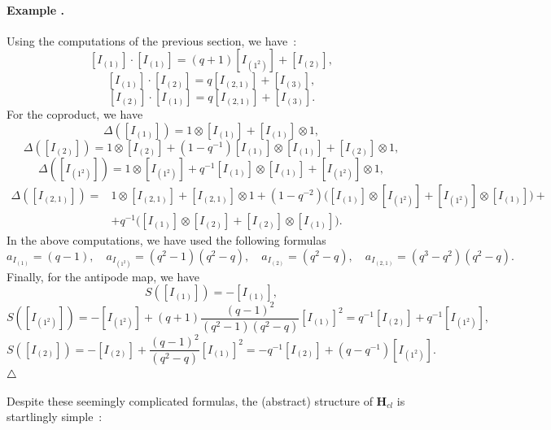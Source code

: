 \documentclass[a4paper,10pt]{amsart}
\def\H{\mathbf{H}}
\def\endexample{$\hfill \triangle$}
\numberwithin{equation}{section}
\begin{document}
\paragraph{\textbf{Example \thetheo.}} Using the computations of the previous section, we have~:
$$[I_{(1)}]  \cdot [I_{(1)}]=(q+1) [I_{(1^2)}] + [I_{(2)}],$$
$$[I_{(1)}] \cdot [I_{(2)}]=q [I_{(2,1)}] + [I_{(3)}],$$
$$ [I_{(2)}] \cdot [I_{(1)}]=q [I_{(2,1)}] + [I_{(3)}]. $$
For the coproduct, we have
$$\Delta ([I_{(1)}])=1 \otimes [I_{(1)}] + [I_{(1)}] \otimes 1,$$
$$\Delta([I_{(2)}])=1 \otimes [I_{(2)}] + (1-q^{-1})[I_{(1)}] \otimes [I_{(1)}] +[I_{(2)}] \otimes 1,$$
$$\Delta([I_{(1^2)}])=1 \otimes [I_{(1^2)}] + q^{-1}[I_{(1)}] \otimes [I_{(1)}] +[I_{(1^2)}] \otimes 1,$$
\begin{equation*}
\begin{split}
\Delta([I_{(2,1)}])=& 1 \otimes [I_{(2,1)}]+ [I_{(2,1)}] \otimes 1 + (1-q^{-2}) \big( [I_{(1)}] \otimes [I_{(1^2)}] + [I_{(1^2)}] \otimes [I_{(1)}] \big) +\\
&+ q^{-1} \big( [I_{(1)}] \otimes [I_{(2)}] + [I_{(2)}] \otimes [I_{(1)}]\big).
\end{split}
\end{equation*}
In the above computations, we have used the following formulas
$$a_{I_{(1)}}=(q-1), \quad a_{I_{(1^2)}}=(q^2-1)(q^2-q), \quad a_{I_{(2)}}=(q^2-q), \quad a_{I_{(2,1)}}=(q^3-q^2)(q^2-q).$$
Finally, for the antipode map, we have
$$S([I_{(1)}])=-[I_{(1)}],$$
$$S([I_{(1^2)}])=-[I_{(1^2)}] + (q+1) \frac{(q-1)^2}{(q^2-1)(q^2-q)} [I_{(1)}]^2=q^{-1} [I_{(2)}] + q^{-1}[I_{(1^2)}],$$
$$S([I_{(2)}])=-[I_{(2)}] + \frac{(q-1)^2}{(q^2-q)} [I_{(1)}]^2=-q^{-1} [I_{(2)}] +(q- q^{-1})[I_{(1^2)}].$$
\endexample

\vspace{.15in}

Despite these seemingly complicated formulas, the (abstract) structure of $\H_{cl}$ is startlingly simple~:
\end{document}
